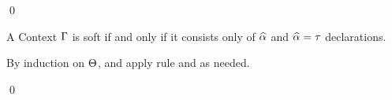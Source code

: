 \qed

\begin{definition}[Softness]
  A Context $\Gamma$ is soft if and only if it consists only of $\widehat{\alpha}$ and
  $\widehat{\alpha} = \tau$ declarations.
\end{definition}

\begin{lemma}[\RightSoftnessName]
  \label{lemma:\RightSoftnessName}
  \RightSoftnessBody
\end{lemma}

\proof

By induction on $\Theta$, and apply rule  and  as needed.

\qed

\begin{lemma}[\ExtensionOrderName]\leavevmode
  \label{lemma:\ExtensionOrderName}
  \ExtensionOrderBody
\end{lemma}

\proof

